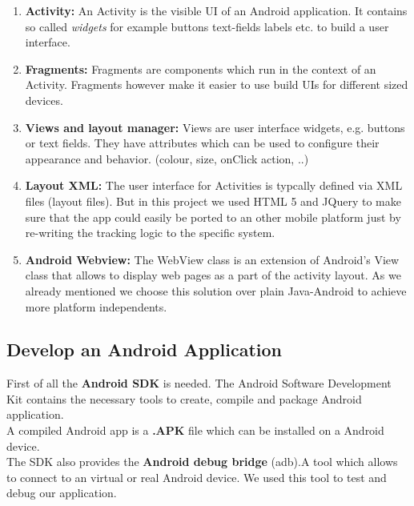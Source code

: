 \begin{enumerate}
\item \textbf{Activity:} An Activity is the visible UI of an Android application. It contains so called \textit{widgets} for example buttons text-fields labels etc. to build a user interface. \cite{androidDevTut}

\item \textbf{Fragments:} Fragments
are components which run in the context of an
Activity. Fragments however make it easier to use build UIs for different sized devices.\cite{androidDevTut}


\item \textbf{Views and layout manager:} Views
are user interface widgets, e.g. buttons or text fields. They have attributes which can be used to configure their appearance
and behavior. (colour, size, onClick action, ..) \cite{androidDevTut}

\item \textbf{Layout XML:}
The user interface for Activities is typcally defined via XML files (layout files).\cite{androidDevTut}  But in this project we used HTML 5 and JQuery to make sure that the app could easily be ported to an other mobile platform just by re-writing the tracking logic to the specific system.

\item \textbf{Android Webview:} The WebView class is an extension of Android's View class that allows to display web pages as a part of the activity layout.\cite{androidWebView} As we already mentioned we choose this solution over plain Java-Android to achieve more platform independents.
\end{enumerate}   

\subsection{Develop an Android Application}
First of all the \textbf{Android SDK} is needed. The
Android Software Development Kit contains the necessary tools to create, compile and
package Android application.\cite{androidDevTut} 
\\


A compiled  
Android app is a \textbf{.APK} file which can be installed on a Android device. 
\\

The SDK also provides the \textbf{Android debug bridge}
(adb).A tool which allows to connect to an virtual or
real Android device.\cite{androidDevTut} We used this tool to test and debug our application.
 
